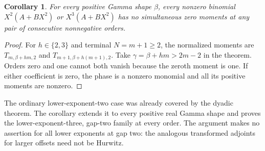 \documentclass[11pt]{article}
\newtheorem{corollary}[theorem]{Corollary}
\begin{document}
\begin{corollary}\label{cor:gap-two-lower-two-three}
For every positive Gamma shape $\beta$, every nonzero binomial
$X^2(A+BX^2)$ or $X^3(A+BX^2)$ has no simultaneous zero moments
at any pair of consecutive nonnegative orders.
\end{corollary}
\begin{proof}
For $h\in\{2,3\}$ and terminal $N=m+1\ge2$, the normalized
moments are $T_{m,\beta+hm,2}$ and
$T_{m+1,\beta+h(m+1),2}$.
Take $\gamma=\beta+hm>2m-2$ in the theorem.
Orders zero and one cannot both vanish because the zeroth moment
is one. If either coefficient is zero, the phase is a nonzero
monomial and all its positive moments are nonzero.
\end{proof}
The ordinary lower-exponent-two case was already covered by the
dyadic theorem. The corollary extends it to every positive real
Gamma shape and proves the lower-exponent-three, gap-two family
at every order. The argument makes no assertion for all lower
exponents at gap two: the analogous transformed adjoints for
larger offsets need not be Hurwitz.
\end{document}
